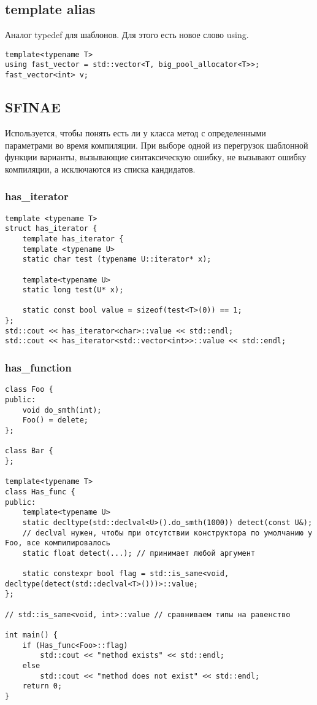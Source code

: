 \subsection{template alias}
Аналог typedef для шаблонов. Для этого есть новое слово using.
\begin{verbatim}
template<typename T>
using fast_vector = std::vector<T, big_pool_allocator<T>>;
fast_vector<int> v;
\end{verbatim}

\subsection{SFINAE}
Используется, чтобы понять есть ли у класса метод с определенными параметрами во время компиляции.
При выборе одной из перегрузок шаблонной функции варианты, вызывающие синтаксическую ошибку, не вызывают ошибку компиляции, а исключаются из списка кандидатов.

\subsubsection{has\_iterator}
\begin{verbatim}
template <typename T>
struct has_iterator {
	template has_iterator {
	template <typename U>
	static char test (typename U::iterator* x);

	template<typename U>
	static long test(U* x);

	static const bool value = sizeof(test<T>(0)) == 1;
};
std::cout << has_iterator<char>::value << std::endl;
std::cout << has_iterator<std::vector<int>>::value << std::endl;
\end{verbatim}

\subsubsection{has\_function}
\begin{verbatim}
class Foo {
public:
    void do_smth(int);
	Foo() = delete;
};

class Bar {
};

template<typename T>
сlass Has_func {
public:
	template<typename U>
	static decltype(std::declval<U>().do_smth(1000)) detect(const U&); 
	// declval нужен, чтобы при отсутствии конструктора по умолчанию у Foo, все компилировалось 
	static float detect(...); // принимает любой аргумент

	static constexpr bool flag = std::is_same<void, decltype(detect(std::declval<T>()))>::value;
};

// std::is_same<void, int>::value // сравниваем типы на равенство

int main() {
    if (Has_func<Foo>::flag)
	    std::cout << "method exists" << std::endl;
	else
	    std::cout << "method does not exist" << std::endl;
	return 0;
}
\end{verbatim}

